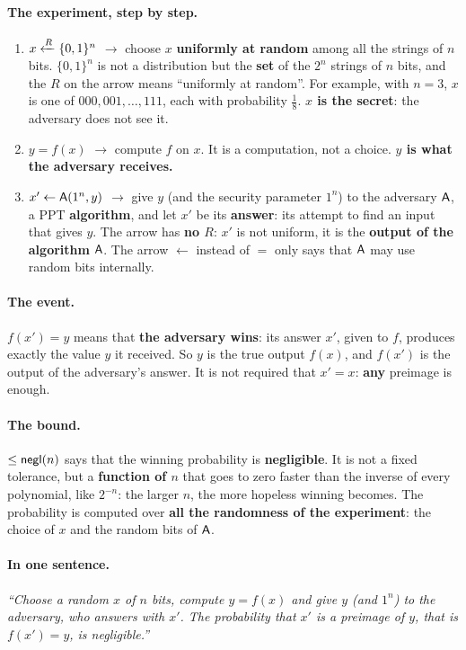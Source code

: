 \paragraph{The experiment, step by step.}
\begin{enumerate}
  \item \textbf{$x \xleftarrow{R} \{0,1\}^n$} $\to$ choose $x$ \textbf{uniformly at random} among all the strings of $n$ bits. $\{0,1\}^n$ is not a distribution but the \textbf{set} of the $2^n$ strings of $n$ bits, and the $R$ on the arrow means ``uniformly at random''. For example, with $n = 3$, $x$ is one of $000, 001, \ldots, 111$, each with probability $\frac{1}{8}$. \textbf{$x$ is the secret}: the adversary does not see it.
  \item \textbf{$y = f(x)$} $\to$ compute $f$ on $x$. It is a computation, not a choice. \textbf{$y$ is what the adversary receives.}
  \item \textbf{$x' \leftarrow \mathsf{A}(1^n, y)$} $\to$ give $y$ (and the security parameter $1^n$) to the adversary $\mathsf{A}$, a PPT \textbf{algorithm}, and let $x'$ be its \textbf{answer}: its attempt to find an input that gives $y$. The arrow has \textbf{no $R$}: $x'$ is not uniform, it is the \textbf{output of the algorithm} $\mathsf{A}$. The arrow $\leftarrow$ instead of $=$ only says that $\mathsf{A}$ may use random bits internally.
\end{enumerate}

\paragraph{The event.} $f(x') = y$ means that \textbf{the adversary wins}: its answer $x'$, given to $f$, produces exactly the value $y$ it received. So $y$ is the true output $f(x)$, and $f(x')$ is the output of the adversary's answer. It is not required that $x' = x$: \textbf{any} preimage is enough.

\paragraph{The bound.} $\leq \mathsf{negl}(n)$ says that the winning probability is \textbf{negligible}. It is not a fixed tolerance, but a \textbf{function of $n$} that goes to zero faster than the inverse of every polynomial, like $2^{-n}$: the larger $n$, the more hopeless winning becomes. The probability is computed over \textbf{all the randomness of the experiment}: the choice of $x$ and the random bits of $\mathsf{A}$.

\paragraph{In one sentence.} \textit{``Choose a random $x$ of $n$ bits, compute $y = f(x)$ and give $y$ (and $1^n$) to the adversary, who answers with $x'$. The probability that $x'$ is a preimage of $y$, that is $f(x') = y$, is negligible.''}

